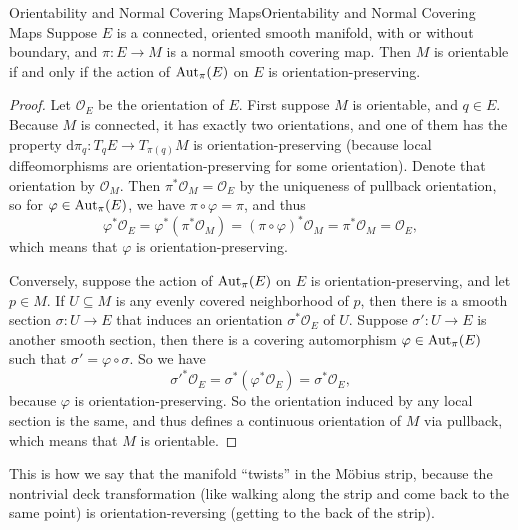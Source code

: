 \documentclass[../main.tex]{subfiles}
\begin{document}
\begin{theorem}{Orientability and Normal Covering Maps}{Orientability and Normal Covering Maps}
  Suppose $E$ is a connected, oriented smooth manifold, with or without boundary, and $\pi: E \to M$ is a normal smooth covering map. Then $M$ is orientable if and only if the action of $\operatorname{Aut}_\pi(E)$ on $E$ is orientation-preserving.
\end{theorem}
\begin{proof}
  Let $\mathcal{O}_E$ be the orientation of $E$. First suppose $M$ is orientable, and $q\in E$. Because $M$ is connected, it has exactly two orientations, and one of them has the property $\mathrm{d} \pi_q : T_qE \to T_{\pi(q)}M$ is orientation-preserving (because local diffeomorphisms are orientation-preserving for some orientation). Denote that orientation by $\mathcal{O}_M$. Then $\pi^* \mathcal{O}_M = \mathcal{O}_E$ by the uniqueness of pullback orientation, so for $\varphi \in \operatorname{Aut}_\pi(E)$, we have $\pi \circ \varphi = \pi$, and thus
  \begin{equation*}
    \varphi^* \mathcal{O}_E = \varphi^* (\pi^* \mathcal{O}_M) = (\pi \circ \varphi)^* \mathcal{O}_M = \pi^* \mathcal{O}_M = \mathcal{O}_E,
  \end{equation*}
  which means that $\varphi$ is orientation-preserving.

  Conversely, suppose the action of $\operatorname{Aut}_\pi(E)$ on $E$ is orientation-preserving, and let $p\in M$. If $U \subseteq M$ is any evenly covered neighborhood of $p$, then there is a smooth section $\sigma: U \to E$ that induces an orientation $\sigma^* \mathcal{O}_E$ of $U$. Suppose $\sigma': U \to E$ is another smooth section, then there is a covering automorphism $\varphi \in \operatorname{Aut}_\pi(E)$ such that $\sigma' = \varphi \circ \sigma$. So we have
  \begin{equation*}
    \sigma'^* \mathcal{O}_E = \sigma^* (\varphi^* \mathcal{O}_E) = \sigma^* \mathcal{O}_E,
  \end{equation*}
  because $\varphi$ is orientation-preserving. So the orientation induced by any local section is the same, and thus defines a continuous orientation of $M$ via pullback, which means that $M$ is orientable.
\end{proof}

\begin{remark}
  This is how we say that the manifold ``twists'' in the M\"obius strip, because the nontrivial deck transformation (like walking along the strip and come back to the same point) is orientation-reversing (getting to the back of the strip).
\end{remark}
\end{document}
